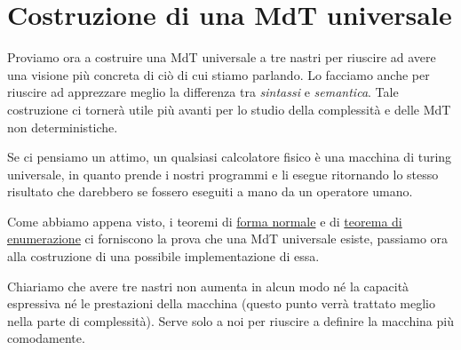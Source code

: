\chapter{Costruzione di una MdT universale}
Proviamo ora a costruire una MdT universale a tre nastri per
riuscire ad avere una visione più concreta di ciò di cui stiamo
parlando. Lo facciamo anche per riuscire ad apprezzare meglio la
differenza tra \emph{sintassi} e \emph{semantica}. Tale
costruzione ci tornerà utile più avanti per lo studio della
complessità e delle MdT non deterministiche.

Se ci pensiamo un attimo, un qualsiasi calcolatore fisico è una
macchina di turing universale, in quanto prende i nostri
programmi e li esegue ritornando lo stesso risultato che
darebbero se fossero eseguiti a mano da un operatore umano.

Come abbiamo appena visto, i teoremi di
\hyperref[th: fn]{forma normale} e di
\hyperref[th: enum]{teorema di enumerazione} ci forniscono la
prova che una MdT universale esiste, passiamo ora alla
costruzione di una possibile implementazione di essa.

Chiariamo che avere tre nastri non aumenta in alcun modo né la
capacità espressiva né le prestazioni della macchina (questo
punto verrà trattato meglio nella parte di complessità). Serve
solo a noi per riuscire a definire la macchina più comodamente.
